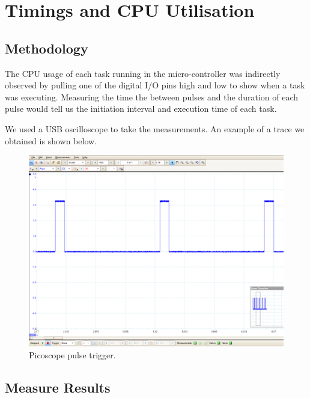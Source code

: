 \documentclass{article}
\begin{document}
\section{Timings and CPU Utilisation}
\subsection{Methodology}

\noindent
The CPU usage of each task running in the micro-controller was indirectly observed by pulling one of the digital I/O pins high and low to show when a task was executing. Measuring the time the between pulses and the duration of each pulse would tell us the initiation interval and execution time of each task.

We used a USB oscilloscope to take the measurements. An example of a trace we obtained is shown below.

\begin{figure}[H]
\begin{center}
   \includegraphics[width=0.9\linewidth]{ScopeOutput.png}
\end{center}
   \caption{Picoscope pulse trigger.}
\label{fig:long}
\label{fig:onecol}
\end{figure}


\subsection{Measure Results}
\end{document}
